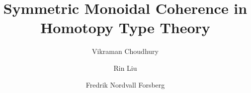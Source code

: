 \documentclass[a4paper,UKenglish,cleveref]{lipics-v2021}
\title{Symmetric Monoidal Coherence in Homotopy Type Theory} %
\author%
{Vikraman Choudhury}%
{University of Strathclyde, Glasgow, United Kingdom}%
{vikraman.choudhury@strath.ac.uk}%
{https://orcid.org/0000-0003-2030-8056}%
{}%
\author%
{Rin Liu}%
{University of Strathclyde, Glasgow, United Kingdom}%
{rin.liu@strath.ac.uk}
{https://orcid.org/0009-0005-8791-2495}%
{}%
\author%
{Fredrik Nordvall Forsberg}%
{University of Strathclyde, Glasgow, United Kingdom}%
{fredrik.nordvall-forsberg@strath.ac.uk}%
{https://orcid.org/0000-0001-6157-9288}%
{}%
\begin{document}
\maketitle

\begin{abstract}
  
\end{abstract}




\label{body-end}

\renewcommand{\appendixsectionformat}[2]{
  {Supplementary material for Section~#1 (#2)}
}


\appendix
\end{document}
